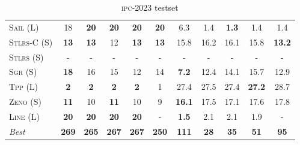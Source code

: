 \documentclass[11pt]{article}
\begin{document}
\begin{table}[tb]
{\begin{tabular}{|l||ccccc||ccccc||}
\textsc{Sail} (L)&18&\textbf{20}&\textbf{20}&\textbf{20}&\textbf{20}&6.3&1.4&\textbf{1.3}&1.4&1.4\\
\textsc{Stlrs-C} (S)&\textbf{13}&\textbf{13}&12&\textbf{13}&\textbf{13}&15.8&16.2&16.1&15.8&\textbf{13.2}\\
\textsc{Stlrs} (S)&-&-&-&-&-&-&-&-&-&-\\
\textsc{Sgr} (S)&\textbf{18}&16&15&12&14&\textbf{7.2}&12.4&14.1&15.7&12.9\\
\textsc{Tpp} (L)&\textbf{2}&\textbf{2}&\textbf{2}&\textbf{2}&1&27.4&27.5&27.4&\textbf{27.2}&28.7\\
\textsc{Zeno} (S)&\textbf{11}&10&\textbf{11}&10&9&\textbf{16.1}&17.5&17.1&17.6&17.8\\
\textsc{Line} (L)&\textbf{20}&\textbf{20}&\textbf{20}&\textbf{20}&-&\textbf{1.5}&2.1&2.1&1.9&-
\\\hline
\textit{Best}&\textbf{269}&\textbf{265}&\textbf{267}&\textbf{267}&\textbf{250}&\textbf{111}&\textbf{28}&\textbf{35}&\textbf{51}&\textbf{95}\\\hline

        \end{tabular}}
        \caption{\textsc{ipc}-2023 testset}
        \label{tab:ipc}
        \end{table}
        
\end{document}
